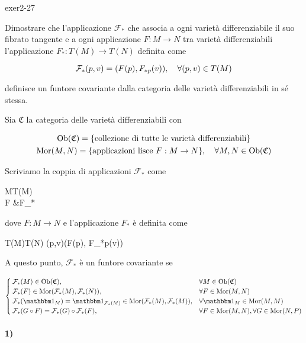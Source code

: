 {exer2-27}
{
Dimostrare che l'applicazione $ \mathcal{F}_{*} $ che associa a ogni varietà differenziabile il suo fibrato tangente e a ogni applicazione $ F : M \to N $ tra varietà differenziabili l'applicazione $ F_{*} : T(M) \to T(N) $ definita come

\begin{equation}
	\mathcal{F}_{*}(p,v) = (F(p), F_{*p}(v)) \qcomma \forall (p,v) \in T(M)
\end{equation}

definisce un funtore covariante dalla categoria delle varietà differenziabili in sé stessa.
}
{
Sia $ \mathfrak{C} $ la categoria delle varietà differenziabili con

\begin{gather}
	\ob(\mathfrak{C}) = \{ \text{collezione di tutte le varietà differenziabili} \} \\
	\mor(M,N) = \{ \text{applicazioni lisce } F : M \to N \} \qcomma \forall M,N \in \ob(\mathfrak{C})
\end{gather}

Scriviamo la coppia di applicazioni $ \mathcal{F}_{*} $ come

	{}{}
	{M}{T(M) \\
		F &\mapsto F_{*}}

dove $ F : M \to N $ e l'applicazione $ F_{*} $ è definita come

	{T(M)}{T(N)}
	{(p,v)}{(F(p), F_{*p}(v))}

A questo punto, $ \mathcal{F}_{*} $ è un funtore covariante se

\begin{equation}
	\begin{cases}
		\mathcal{F}_{*}(M) \in \ob(\mathfrak{C}), & \forall M \in \ob(\mathfrak{C}) \\
		\mathcal{F}_{*}(F) \in \mor(\mathcal{F}_{*}(M),\mathcal{F}_{*}(N)), & \forall F \in \mor(M,N) \\
		\mathcal{F}_{*}(\bigone_{M}) = \bigone_{\mathcal{F}_{*}(M)} \in \mor(\mathcal{F}_{*}(M),\mathcal{F}_{*}(M)), & \forall \bigone_{M} \in \mor(M,M) \\
		\mathcal{F}_{*}(G \circ F) = \mathcal{F}_{*}(G) \circ \mathcal{F}_{*}(F), & \forall F \in \mor(M,N), \forall G \in \mor(N,P)
	\end{cases}
\end{equation}

\paragraph{1)}

}
